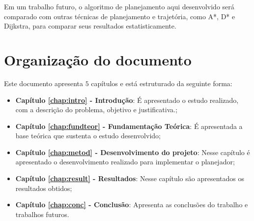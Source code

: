 Em um trabalho futuro, o algoritmo de planejamento aqui desenvolvido será comparado com outras técnicas de planejamento e trajetória, como A*, D* e Dijkstra, para comparar seus resultados estatisticamente.

\section{Organização do documento}
\label{section:organizacao}

Este documento apresenta $5$ capítulos e está estruturado da seguinte forma:

\begin{itemize}

  \item \textbf{Capítulo \ref{chap:intro} - Introdução}: É apresentado o estudo realizado, com a descrição do problema, objetivo e justificativa.;
  \item \textbf{Capítulo \ref{chap:fundteor} - Fundamentação Teórica}: É apresentada a base teórica que sustenta o estudo desenvolvido;
  \item \textbf{Capítulo \ref{chap:metod} - Desenvolvimento do projeto}: Nesse capítulo é apresentado o desenvolvimento realizado para implementar o planejador;
  \item \textbf{Capítulo \ref{chap:result} - Resultados}: Nesse capítulo são apresentados os resultados obtidos;
  \item \textbf{Capítulo \ref{chap:conc} - Conclusão}: Apresenta as conclusões do trabalho e trabalhos futuros.

\end{itemize}
